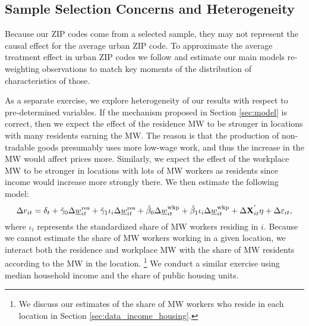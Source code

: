 \subsection{Sample Selection Concerns and Heterogeneity}\label{sec:emp_start_heterogeneity}

Because our ZIP codes come from a selected sample, they may not represent
the causal effect for the average urban ZIP code.
To approximate the average treatment effect in urban ZIP codes we follow
\textcite{Hainmueller2012} and estimate our main models re-weighting 
observations to match key moments of the distribution of characteristics of 
those.

As a separate exercise, we explore heterogeneity of our results with respect
to pre-determined variables.
If the mechanism proposed in Section \ref{sec:model} is correct, then we
expect the effect of the residence MW to be stronger in locations with many 
residents earning the MW.
The reason is that the production of non-tradable goods presumably uses more
low-wage work, and thus the increase in the MW would affect prices more.
Similarly, we expect the effect of the workplace MW to be stronger in locations
with lots of MW workers as residents since income would increase more 
strongly there.
We then estimate the following model:
\begin{equation}\label{eq:fd_heterogeneity}
    \Delta r_{it} = \delta_t
                  + \tilde\gamma_0 \Delta \underline{w}^{\text{res}}_{it}
                  + \tilde\gamma_1 \iota_i \Delta \underline{w}^{\text{res}}_{it}
                  + \tilde\beta_0 \Delta \underline{w}^{\text{wkp}}_{it}
                  + \tilde\beta_1 \iota_i \Delta \underline{w}^{\text{wkp}}_{it}
                  + \Delta \mathbf{X}^{'}_{it}\eta
                  + \Delta \varepsilon_{it} ,
\end{equation}
where $\iota_i$ represents the standardized share of MW workers residing in $i$.
Because we cannot estimate the share of MW workers working in a given location,
we interact both the residence and workplace MW with the share of MW residents
according to the MW in the location.%
\footnote{We discuss our estimates of the share of MW workers who reside in each 
location in Section \ref{sec:data_income_housing}.}
We conduct a similar exercise using median household income and the share of 
public housing units.
